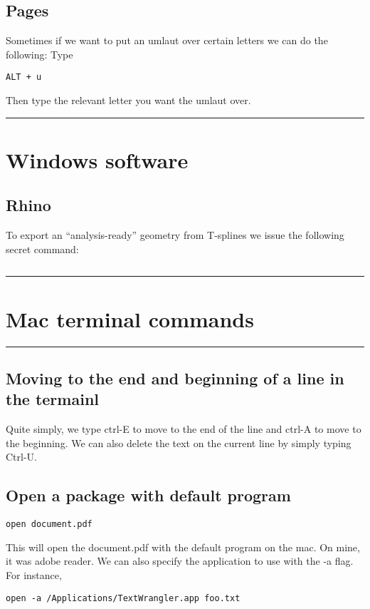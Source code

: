 \documentclass[a4paper, 10pt]{article}
\newcommand{\mytoprule}{\hrule\vspace{4mm}}
\newcommand{\mybotrule}{\vspace{4mm}\hrule}
\begin{document}
\subsection*{Pages}
Sometimes if we want to put an umlaut over certain letters we can do the following: Type
\begin{verbatim}
ALT + u
\end{verbatim}
Then type the relevant letter you want the umlaut over.

\mybotrule

\vspace{10mm}
\section*{Windows software}

\subsection*{Rhino}
\label{sec:rhino}

To export an ``analysis-ready'' geometry from T-splines we issue the
following secret command:
\begin{verbatim}

\end{verbatim}



\mybotrule
\vspace{10mm}
\section*{Mac terminal commands}

\mytoprule
\subsection*{Moving to the end and beginning of a line in the termainl}
Quite simply, we type ctrl-E to move to the end of the line and ctrl-A to move to the beginning. We can also delete the text on the current line by simply typing Ctrl-U.

\subsection*{Open a package with default program}
\begin{Verbatim}[commandchars=\\\{\}]
open document.pdf
\end{Verbatim}

This will open the document.pdf with the default program on the mac. On mine, it was adobe reader. We can also specify the application to use with the -a flag. For instance,
\begin{Verbatim}[commandchars=\\\{\}]
open -a /Applications/TextWrangler.app foo.txt
\end{Verbatim}
\end{document}
